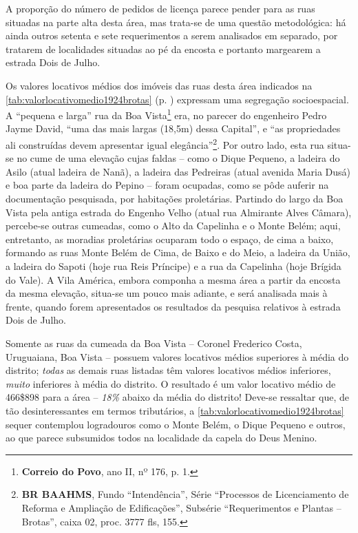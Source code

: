 



A proporção do número de pedidos de licença parece pender para as ruas situadas na parte alta desta área, mas trata-se de uma questão metodológica: há ainda outros setenta e sete requerimentos a serem analisados em separado, por tratarem de localidades situadas ao pé da encosta e portanto margearem a estrada Dois de Julho.


Os valores locativos médios dos imóveis das ruas desta área indicados na \autoref{tab:valorlocativomedio1924brotas} (p. \pageref{tab:valorlocativomedio1924brotas}) expressam uma segregação socioespacial. A ``pequena e larga'' rua da Boa Vista\footnote{\textbf{Correio do Povo}, ano II, nº 176, p. 1.} era, no parecer do engenheiro Pedro Jayme David, ``uma das mais largas (18,5m) dessa Capital'', e ``as propriedades ali construídas devem apresentar igual elegância''\footnote{\textbf{BR BAAHMS}, Fundo ``Intendência'', Série ``Processos de Licenciamento de Reforma e Ampliação de Edificações'', Subsérie ``Requerimentos e Plantas -- Brotas'', caixa 02, proc. 3777 fls, 155.}. Por outro lado, esta rua situa-se no cume de uma elevação cujas faldas -- como o Dique Pequeno, a ladeira do Asilo (atual ladeira de Nanã), a ladeira das Pedreiras (atual avenida Maria Dusá) e boa parte da ladeira do Pepino --  foram ocupadas, como se pôde auferir na documentação pesquisada, por habitações proletárias. Partindo do largo da Boa Vista pela antiga estrada do Engenho Velho (atual rua Almirante Alves Câmara), percebe-se outras cumeadas, como o Alto da Capelinha e o Monte Belém; aqui, entretanto, as moradias proletárias ocuparam todo o espaço, de cima a baixo, formando as ruas Monte Belém de Cima, de Baixo e do Meio, a ladeira da União, a ladeira do Sapoti (hoje rua Reis Príncipe) e a rua da Capelinha (hoje Brígida do Vale). A Vila América, embora componha a mesma área a partir da encosta da mesma elevação, situa-se um pouco mais adiante, e será analisada mais à frente, quando forem apresentados os resultados da pesquisa relativos à estrada Dois de Julho. 

Somente as ruas da cumeada da Boa Vista -- Coronel Frederico Costa, Uruguaiana, Boa Vista -- possuem valores locativos médios superiores à média do distrito; \textit{todas} as demais ruas listadas têm valores locativos médios inferiores, \textit{muito} inferiores à média do distrito. O resultado é um valor locativo médio de 466\$898 para a área -- \textit{18\%} abaixo da média do distrito! Deve-se ressaltar que, de tão desinteressantes em termos tributários, a \autoref{tab:valorlocativomedio1924brotas} sequer contemplou logradouros como o Monte Belém, o Dique Pequeno e outros, ao que parece subsumidos todos na localidade da capela do Deus Menino.

